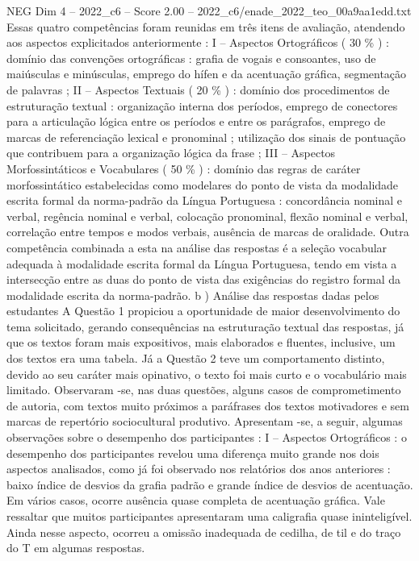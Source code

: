 \begin{textsample}{NEG Dim 4 – 2022\_c6 – Score 2.00 – 2022\_c6/enade\_2022\_teo\_00a9aa1edd.txt}
Essas quatro competências foram reunidas em três itens de avaliação, atendendo aos aspectos explicitados anteriormente : I – Aspectos Ortográficos ( 30 \% ) : domínio das convenções ortográficas : grafia de vogais e consoantes, uso de maiúsculas e minúsculas, emprego do hífen e da acentuação gráfica, segmentação de palavras ; II – Aspectos Textuais ( 20 \% ) : domínio dos procedimentos de estruturação textual : organização interna dos períodos, emprego de conectores para a articulação lógica entre os períodos e entre os parágrafos, emprego de marcas de referenciação lexical e pronominal ; utilização dos sinais de pontuação que contribuem para a organização lógica da frase ; III – Aspectos Morfossintáticos e Vocabulares ( 50 \% ) : domínio das regras de caráter morfossintático estabelecidas como modelares do ponto de vista da modalidade escrita formal da norma-padrão da Língua Portuguesa : concordância nominal e verbal, regência nominal e verbal, colocação pronominal, flexão nominal e verbal, correlação entre tempos e modos verbais, ausência de marcas de oralidade.
Outra competência combinada a esta na análise das respostas é a seleção vocabular adequada à modalidade escrita formal da Língua Portuguesa, tendo em vista a intersecção entre as duas do ponto de vista das exigências do registro formal da modalidade escrita da norma-padrão. b ) Análise das respostas dadas pelos estudantes A Questão 1 propiciou a oportunidade de maior desenvolvimento do tema solicitado, gerando consequências na estruturação textual das respostas, já que os textos foram mais expositivos, mais elaborados e fluentes, inclusive, um dos textos era uma tabela.
Já a Questão 2 teve um comportamento distinto, devido ao seu caráter mais opinativo, o texto foi mais curto e o vocabulário mais limitado.
Observaram -se, nas duas questões, alguns casos de comprometimento de autoria, com textos muito próximos a paráfrases dos textos motivadores e sem marcas de repertório sociocultural produtivo.
Apresentam -se, a seguir, algumas observações sobre o desempenho dos participantes : I – Aspectos Ortográficos : o desempenho dos participantes revelou uma diferença muito grande nos dois aspectos analisados, como já foi observado nos relatórios dos anos anteriores : baixo índice de desvios da grafia padrão e grande índice de desvios de acentuação.
Em vários casos, ocorre ausência quase completa de acentuação gráfica.
Vale ressaltar que muitos participantes apresentaram uma caligrafia quase ininteligível.
Ainda nesse aspecto, ocorreu a omissão inadequada de cedilha, de til e do traço do T em algumas respostas.

\end{textsample}
